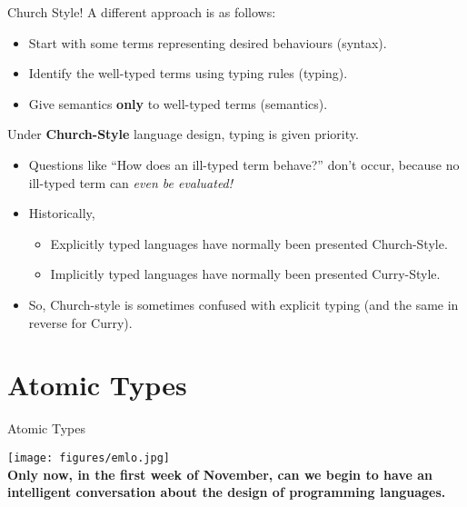 \documentclass[11pt]{beamer}
\begin{document}
\begin{frame}[fragile=singleslide]{Church Style!}
A different approach is as follows:
\begin{itemize}
\item Start with some terms representing desired behaviours (syntax).
\item Identify the well-typed terms using typing rules (typing).
\item Give semantics \textbf{only} to well-typed terms (semantics).
\end{itemize}
Under \textbf{Church-Style} language design, typing is given priority.
\begin{itemize}
\item Questions like ``How does an ill-typed term behave?'' don't occur, because no ill-typed term can \emph{even be evaluated!}
\item Historically, 
\begin{itemize}
\item Explicitly typed languages have normally been presented Church-Style.
\item Implicitly typed languages have normally been presented Curry-Style.
\end{itemize}
\item So, Church-style is sometimes confused with explicit typing (and the same in reverse for Curry).
\end{itemize}
\end{frame}


\section[Atomic]{Atomic Types}
\begin{frame}[fragile=singleslide]{Atomic Types}
\begin{center}
\texttt{[image: figures/emlo.jpg]} \\
\textbf{Only now, in the first week of November, can we begin to have an intelligent conversation about the design of programming languages.}
\end{center}
\end{frame}
\end{document}
